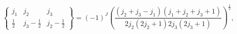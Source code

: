 \[\begin{Bmatrix}j_{1}&j_{2}&j_{3}\\
\frac{1}{2}&j_{3}-\frac{1}{2}&j_{2}-\frac{1}{2}\end{Bmatrix}=(-1)^{J}\left(%
\frac{(j_{2}+j_{3}-j_{1})(j_{1}+j_{2}+j_{3}+1)}{2j_{2}(2j_{2}+1)2j_{3}(2j_{3}+%
1)}\right)^{\frac{1}{2}},\]